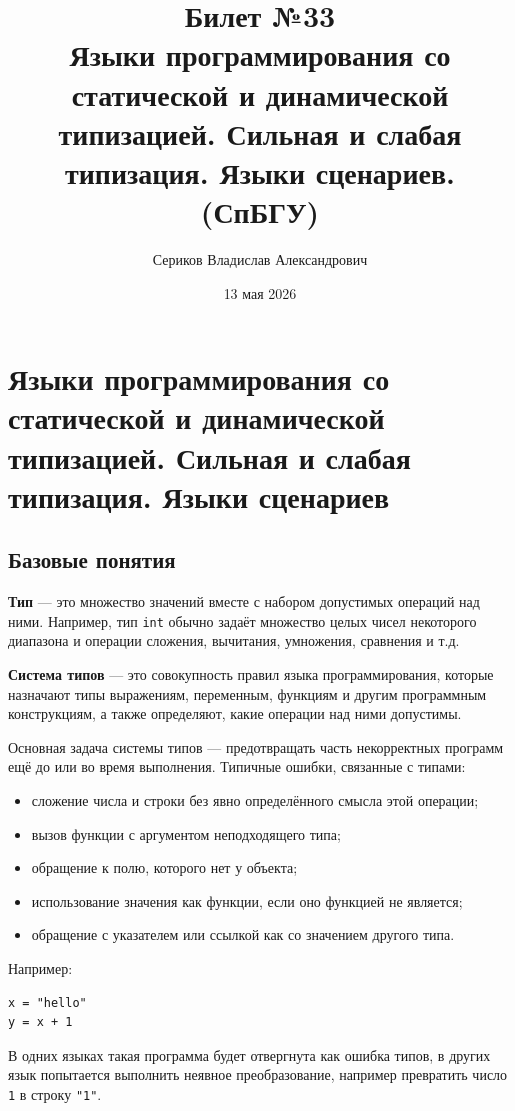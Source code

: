 \documentclass[12pt,a4paper]{article}
\title{Билет №33 \\ \small Языки программирования со статической и динамической типизацией. Сильная и слабая типизация. Языки сценариев. (СпБГУ)}
\author{Сериков Владислав Александрович}
\date{13 мая 2026}
\begin{document}
\maketitle
\tableofcontents
\newpage

\section{Языки программирования со статической и динамической типизацией.
Сильная и слабая типизация. Языки сценариев}

\subsection{Базовые понятия}

\textbf{Тип} --- это множество значений вместе с набором допустимых операций над ними.
Например, тип \texttt{int} обычно задаёт множество целых чисел некоторого диапазона
и операции сложения, вычитания, умножения, сравнения и т.д.

\textbf{Система типов} --- это совокупность правил языка программирования, которые
назначают типы выражениям, переменным, функциям и другим программным конструкциям,
а также определяют, какие операции над ними допустимы.

Основная задача системы типов --- предотвращать часть некорректных программ ещё до
или во время выполнения. Типичные ошибки, связанные с типами:

\begin{itemize}
    \item сложение числа и строки без явно определённого смысла этой операции;
    \item вызов функции с аргументом неподходящего типа;
    \item обращение к полю, которого нет у объекта;
    \item использование значения как функции, если оно функцией не является;
    \item обращение с указателем или ссылкой как со значением другого типа.
\end{itemize}

Например:

\begin{verbatim}
x = "hello"
y = x + 1
\end{verbatim}

В одних языках такая программа будет отвергнута как ошибка типов, в других язык
попытается выполнить неявное преобразование, например превратить число \texttt{1}
в строку \texttt{"1"}.
\end{document}
